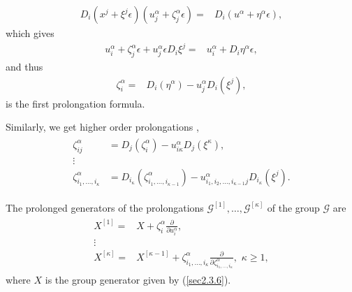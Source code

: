 \begin{enumerate}[(a)]
\begin{defn}
\begin{align}
\label{p3} D_i( x^j +  \xi^j \epsilon)( u_j^{\alpha} +  \zeta_j^{\alpha}\epsilon )   =& D_i( u^{\alpha } +  \eta^{\alpha} \epsilon ), 
\end{align} 
which gives
\begin{align}
\label{p5} u^{\alpha}_i + \zeta_j^{\alpha} \epsilon+  u_j^{\alpha} \epsilon D_i \xi^j   =&  u^{\alpha }_i + D_i \eta^{\alpha} \epsilon ,
\end{align} 
and thus 
\begin{align}
\label{p44} \zeta_i^{\alpha} =& D_i(\eta^{\alpha}  )- u_j^{\alpha}  D_i (\xi^j),
\end{align}
is  the first prolongation formula.
\end{defn}
\begin{rem}
Similarly, we get  higher order prolongations \citep{ibragimov}, 
\begin{align}
\begin{aligned}
\zeta_{ij}^{\alpha} &= D_j(\zeta_i^{\alpha}  )- u_{i\kappa}^{\alpha}  D_j (\xi^{\kappa}),\\
\vdots  \\
\zeta_{i_1,\ldots,i_\kappa}^{\alpha} & = D_{i_\kappa}( \zeta_{i_1,\ldots,i_{\kappa-1}}^{\alpha} )- u_{i_1,i_2,\ldots, i_{\kappa-1}j}^{\alpha}  D_{i_\kappa} (\xi^{j}).
\end{aligned} \label{sec2.4.2}
\end{align}
\end{rem}
 \begin{rem}The  prolonged generators of the prolongations $ \mathcal{G}^{[1]},\ldots,  \mathcal{G}^{[\kappa]}$ of the group $\mathcal{G}$  are  
 	\begin{align} \begin{aligned}
 	X^{[1]} =& X + \zeta_i^{\alpha} \frac{ \partial }{ \partial u_i^{\alpha}},\\
 	\vdots \\
 	X^{[\kappa]} = &X^{[\kappa-1]} + \zeta_{i_1,\ldots,i_\kappa}^{\alpha} \frac{ \partial }{ \partial \zeta_{i_1,\ldots,i_\kappa}^{\alpha}}, \,\, \kappa \geq 1,
 	\end{aligned} \label{sec2.4.3}
 	\end{align} where $X$ is the group generator given by (\ref{sec2.3.6}).\end{rem}
\end{enumerate}
